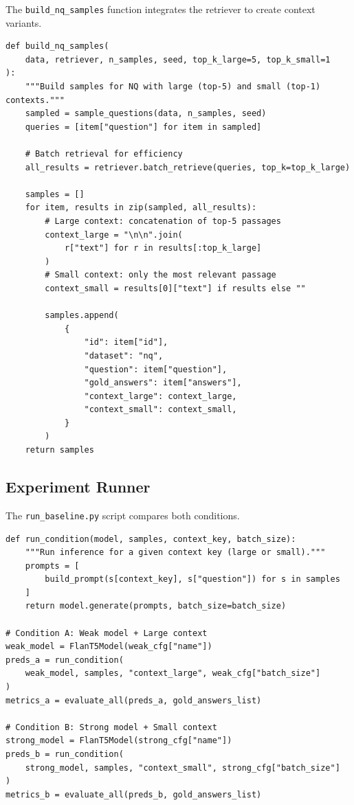 \documentclass[11pt,a4paper]{article}
\begin{document}
The \texttt{build\_nq\_samples} function integrates the retriever to create context variants.

\begin{lstlisting}[caption=Building NQ samples with retrieval, label=lst:build_samples, basicstyle=\ttfamily\footnotesize]
def build_nq_samples(
    data, retriever, n_samples, seed, top_k_large=5, top_k_small=1
):
    """Build samples for NQ with large (top-5) and small (top-1) contexts."""
    sampled = sample_questions(data, n_samples, seed)
    queries = [item["question"] for item in sampled]
    
    # Batch retrieval for efficiency
    all_results = retriever.batch_retrieve(queries, top_k=top_k_large)
    
    samples = []
    for item, results in zip(sampled, all_results):
        # Large context: concatenation of top-5 passages
        context_large = "\n\n".join(
            r["text"] for r in results[:top_k_large]
        )
        # Small context: only the most relevant passage
        context_small = results[0]["text"] if results else ""
        
        samples.append(
            {
                "id": item["id"],
                "dataset": "nq",
                "question": item["question"],
                "gold_answers": item["answers"],
                "context_large": context_large,
                "context_small": context_small,
            }
        )
    return samples
\end{lstlisting}

\subsection{Experiment Runner}

The \texttt{run\_baseline.py} script compares both conditions.

\begin{lstlisting}[caption=Running the baseline experiment, label=lst:run_baseline, basicstyle=\ttfamily\footnotesize]
def run_condition(model, samples, context_key, batch_size):
    """Run inference for a given context key (large or small)."""
    prompts = [
        build_prompt(s[context_key], s["question"]) for s in samples
    ]
    return model.generate(prompts, batch_size=batch_size)

# Condition A: Weak model + Large context
weak_model = FlanT5Model(weak_cfg["name"])
preds_a = run_condition(
    weak_model, samples, "context_large", weak_cfg["batch_size"]
)
metrics_a = evaluate_all(preds_a, gold_answers_list)

# Condition B: Strong model + Small context
strong_model = FlanT5Model(strong_cfg["name"])
preds_b = run_condition(
    strong_model, samples, "context_small", strong_cfg["batch_size"]
)
metrics_b = evaluate_all(preds_b, gold_answers_list)
\end{lstlisting}
\end{document}
